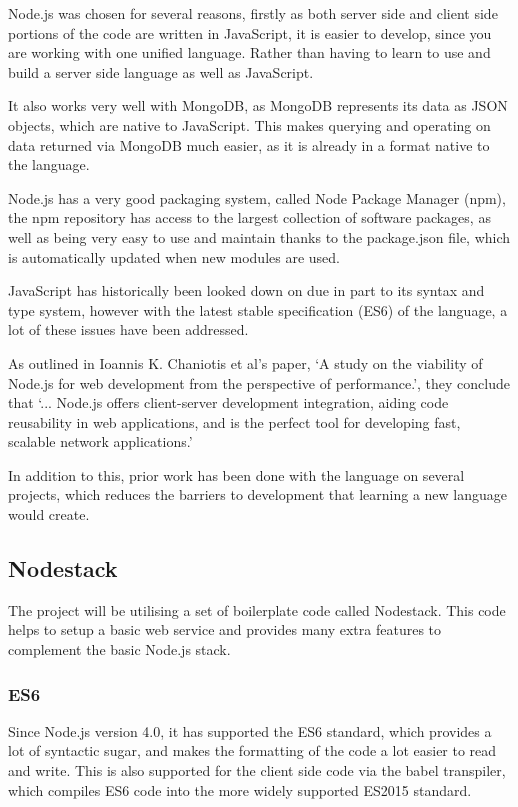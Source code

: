 Node.js was chosen for several reasons, firstly as both server side and client side portions of the code are written in JavaScript, it is easier to develop, since you are working with one unified language. Rather than having to learn to use and build a server side language as well as JavaScript.

It also works very well with MongoDB, as MongoDB represents its data as JSON objects, which are native to JavaScript. This makes querying and operating on data returned via MongoDB much easier, as it is already in a format native to the language. 

Node.js has a very good packaging system, called Node Package Manager (npm), the npm repository has access to the largest collection\cite{modulecounts} of software packages, as well as being very easy to use and maintain thanks to the package.json file, which is automatically updated when new modules are used. 

JavaScript has historically been looked down on due in part to its syntax and type system, however with the latest stable specification\cite{es6} (ES6) of the language, a lot of these issues have been addressed. 

As outlined in Ioannis K. Chaniotis et al's paper, `A study on the viability of Node.js for web development from the perspective of performance.', they conclude that `... Node.js offers client-server development integration, aiding code reusability in web applications, and is the perfect tool for developing fast, scalable network applications.'\cite{node-perf}

In addition to this, prior work has been done with the language on several projects, which reduces the barriers to development that learning a new language would create. 

\subsection{Nodestack}
The project will be utilising a set of boilerplate code called Nodestack\cite{nodestack}. This code helps to setup a basic web service and provides many extra features to complement the basic Node.js stack. 

\subsubsection*{ES6}

    Since Node.js version 4.0, it has supported the ES6 standard, which provides a lot of syntactic sugar, and makes the formatting of the code a lot easier to read and write. This is also supported for the client side code via the babel transpiler, which compiles ES6 code into the more widely supported ES2015 standard.

